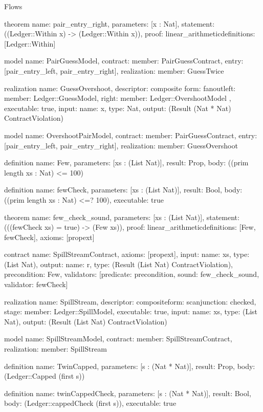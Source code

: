 \begin{lexlean}{Flows}
\begin{semanticmodule}
theorem{
  name: pair_entry_right,
  parameters: [x : Nat],
  statement: ((Ledger::Within x) -> (Ledger::Within x)),
  proof: linear_arithmetic{definitions: [Ledger::Within]}
}

model{
  name: PairGuessModel,
  contract: {member: PairGuessContract},
  entry: [pair_entry_left, pair_entry_right],
  realization: {member: GuessTwice}
}

realization{
  name: GuessOvershoot,
  descriptor: composite{
    form: fanout{left: {member: Ledger::GuessModel}, right: {member: Ledger::OvershootModel}}
  },
  executable: true,
  input: {name: x, type: Nat},
  output: (Result (Nat * Nat) ContractViolation)
}

model{
  name: OvershootPairModel,
  contract: {member: PairGuessContract},
  entry: [pair_entry_left, pair_entry_right],
  realization: {member: GuessOvershoot}
}

definition{
  name: Few,
  parameters: [xs : (List Nat)],
  result: Prop,
  body: ((prim length xs : Nat) <= 100)
}

definition{
  name: fewCheck,
  parameters: [xs : (List Nat)],
  result: Bool,
  body: ((prim length xs : Nat) <=? 100),
  executable: true
}

theorem{
  name: few_check_sound,
  parameters: [xs : (List Nat)],
  statement: (((fewCheck xs) = true) -> (Few xs)),
  proof: linear_arithmetic{definitions: [Few, fewCheck]},
  axioms: [propext]
}

contract{
  name: SpillStreamContract,
  axioms: [propext],
  input: {name: xs, type: (List Nat)},
  output: {name: r, type: (Result (List Nat) ContractViolation)},
  precondition: Few,
  validators: [{predicate: precondition, sound: few_check_sound, validator: fewCheck}]
}

realization{
  name: SpillStream,
  descriptor: composite{form: scan{junction: checked{}, stage: {member: Ledger::SpillModel}}},
  executable: true,
  input: {name: xs, type: (List Nat)},
  output: (Result (List Nat) ContractViolation)
}

model{
  name: SpillStreamModel,
  contract: {member: SpillStreamContract},
  realization: {member: SpillStream}
}

definition{
  name: TwinCapped,
  parameters: [s : (Nat * Nat)],
  result: Prop,
  body: (Ledger::Capped (first s))
}

definition{
  name: twinCappedCheck,
  parameters: [s : (Nat * Nat)],
  result: Bool,
  body: (Ledger::cappedCheck (first s)),
  executable: true
}


\end{semanticmodule}
\end{lexlean}
